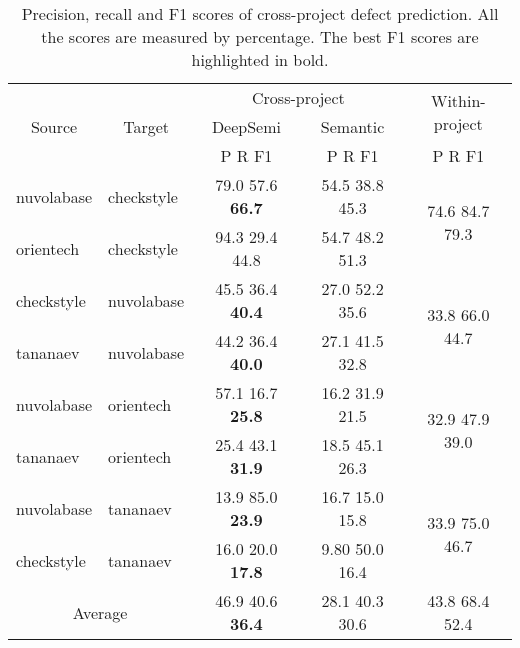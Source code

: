 \begin{table}[t!]
	\centering
	\caption{Precision, recall and F1 scores of cross-project defect prediction. All the scores are measured by percentage. The best F1 scores are highlighted in bold.}
	\begin{adjustbox}{width=0.48\textwidth}
	\begin{tabular}{|c|c|c|c|c|}
		\hline
		\multirow{3}[6]{*}{Source } & \multirow{3}[6]{*}{Target} & \multicolumn{2}{c|}{Cross-project} & \multirow{2}[4]{*}{Within-project} \\
		\cline{3-4}          &       & DeepSemi & Semantic &  \\
		\cline{3-5}          &       & P R F1 & P R F1 & P R F1 \\
		\hline
		\hline
		\multicolumn{1}{|l|}{nuvolabase} & \multicolumn{1}{l|}{checkstyle} & 79.0 57.6 \textbf{66.7} & 54.5 38.8 45.3  & \multirow{2}[4]{*}{74.6 84.7 79.3} \\
		\cline{1-4}    \multicolumn{1}{|l|}{orientech} & \multicolumn{1}{l|}{checkstyle} & 94.3 29.4 44.8 & 54.7 48.2 51.3 &  \\
		\hline
		\multicolumn{1}{|l|}{checkstyle} & \multicolumn{1}{l|}{nuvolabase} & 45.5 36.4\textbf{ 40.4} & 27.0 52.2 35.6 & \multirow{2}[4]{*}{33.8 66.0 44.7} \\		
		\cline{1-4}    \multicolumn{1}{|l|}{tananaev} & \multicolumn{1}{l|}{nuvolabase} & 44.2 36.4 \textbf{40.0} & 27.1 41.5 32.8 &  \\
		\hline
		\multicolumn{1}{|l|}{nuvolabase} & \multicolumn{1}{l|}{orientech} & 57.1 16.7\textbf{ 25.8}  & 16.2 31.9 21.5 & \multirow{2}[4]{*}{32.9 47.9 39.0} \\
		\cline{1-4}    \multicolumn{1}{|l|}{tananaev} & \multicolumn{1}{l|}{orientech} & 25.4 43.1 \textbf{31.9} & 18.5 45.1 26.3 &  \\
		\hline
		\multicolumn{1}{|l|}{nuvolabase} & \multicolumn{1}{l|}{tananaev} & 13.9 85.0 \textbf{23.9} & 16.7 15.0 15.8 & \multirow{2}[4]{*}{33.9 75.0 46.7} \\
		\cline{1-4}    \multicolumn{1}{|l|}{checkstyle} & \multicolumn{1}{l|}{tananaev} & 16.0 20.0 \textbf{17.8} & 9.80 50.0 16.4 &  \\
		\hline
		\hline
		\multicolumn{2}{|c|}{Average} & 46.9 40.6 \textbf{36.4} & 28.1 40.3 30.6 & 43.8 68.4 52.4 \\
		\hline
	\end{tabular}%
	\end{adjustbox}
	\label{tab:cross}%
\end{table}%

